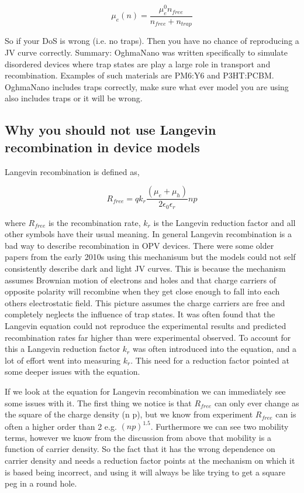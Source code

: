\begin{equation}
\mu_e(n)=\frac{\mu_e^0 n_{free}}{n_{free}+n_{trap}}
\end{equation}

So if your DoS is wrong (i.e. no traps). Then you have no chance of reproducing a JV curve correctly.  Summary: OghmaNano was written specifically to simulate disordered devices where trap states are play a large role in transport and recombination. Examples of such materials are PM6:Y6 and P3HT:PCBM. OghmaNano includes traps correctly, make sure what ever model you are using also includes traps or it will be wrong.

\subsection{Why you should not use Langevin recombination in device models}
Langevin recombination is defined as,

\begin{equation}
R_{free}=q k_{r}\frac{( \mu_e+ \mu_h) }{2\epsilon_0\epsilon_r} n p
\end{equation}

where $R_{free}$ is the recombination rate, $k_{r}$ is the Langevin reduction factor and all other symbols have their usual meaning. In general Langevin recombination is a bad way to describe recombination in OPV devices. There were some older papers from the early 2010s using this mechanisum but the models could not self consistently describe dark and light JV curves. This is because the mechanism assumes Brownian motion of electrons and holes and that charge carriers of opposite polarity will recombine when they get close enough to fall into each others electrostatic field.  This picture assumes the charge carriers are free and completely neglects the influence of trap states. It was often found that the Langevin equation could not reproduce the experimental results and predicted recombination rates far higher than were experimental observed. To account for this a Langevin reduction factor $k_{r}$ was often introduced into the equation, and a lot of effort went into measuring $k_{r}$. This need for a reduction factor pointed at some deeper issues with the equation.

If we look at the equation for Langevin recombination we can immediately see some issues with it. The first thing we notice is that $R_{free}$ can only ever change as the square of the charge density (n p), but we know from experiment $R_{free}$ can is often a higher order than 2 e.g. $(np)^{1.5}$. Furthermore we can see two mobility terms, however we know from the discussion from above that mobility is a function of carrier density. So the fact that it has the wrong dependence on carrier density and needs a reduction factor points at the mechanism on which it is based being incorrect, and using it will always be like trying to get a square peg in a round hole. 

